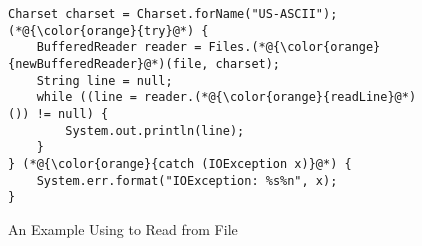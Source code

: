 \begin{figure}[t]%
	\centering
\begin{lstlisting}[]
Charset charset = Charset.forName("US-ASCII");
(*@{\color{orange}{try}@*) {
    BufferedReader reader = Files.(*@{\color{orange}{newBufferedReader}@*)(file, charset);
    String line = null;
    while ((line = reader.(*@{\color{orange}{readLine}@*)()) != null) {
        System.out.println(line);
    }
} (*@{\color{orange}{catch (IOException x)}@*) {
    System.err.format("IOException: %s%n", x);
}
\end{lstlisting}
        \vspace{-16pt}
        \caption{An Example Using  to Read from File}
        \label{fig:example4}
\end{figure}
